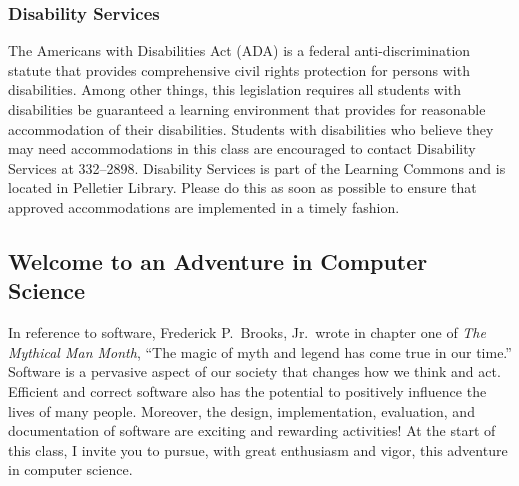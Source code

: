 \documentclass[11pt]{article}
\begin{document}
\subsubsection*{Disability Services}

The Americans with Disabilities Act (ADA) is a federal anti-discrimination
statute that provides comprehensive civil rights protection for persons with
disabilities. Among other things, this legislation requires all students with
disabilities be guaranteed a learning environment that provides for reasonable
accommodation of their disabilities. Students with disabilities who believe they
may need accommodations in this class are encouraged to contact Disability
Services at 332--2898. Disability Services is part of the Learning Commons and
is located in Pelletier Library. Please do this as soon as possible to ensure
that approved accommodations are implemented in a timely fashion.

\subsection*{Welcome to an Adventure in Computer Science}

In reference to software, Frederick P.\ Brooks, Jr.\ wrote in chapter one of
{\em The Mythical Man Month}, ``The magic of myth and legend has come true in
our time.'' Software is a pervasive aspect of our society that changes how we
think and act. Efficient and correct software also has the potential to
positively influence the lives of many people. Moreover, the design,
implementation, evaluation, and documentation of software are exciting and
rewarding activities! At the start of this class, I invite you to pursue, with
great enthusiasm and vigor, this adventure in computer science.
\end{document}
